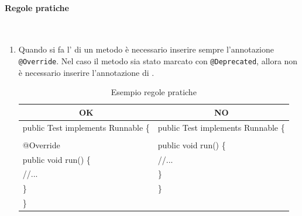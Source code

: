 \paragraph{Regole pratiche}\mbox{}\\[0.4cm]
\begin{enumerate}
	\item Quando si fa l’ di un metodo è necessario inserire sempre l’annotazione \texttt{@Override}. Nel caso il metodo sia stato marcato con \texttt{@Deprecated}, allora non è necessario inserire l’annotazione di .
	\begin{table} [H]
		\begin{center}
			\begin{tabular}{ | l | l |}
				\multicolumn{1}{c}{\textbf{OK}}&\multicolumn{1}{c}{\textbf{NO}}\\ 
				\hline
				public Test implements Runnable \{& public Test implements Runnable \{\\
				&\\
				\hspace{0.5cm}@Override & \hspace{0.5cm}public void run() \{ \\
				\hspace{0.5cm}public void run() \{& \hspace{1cm}//...\\
				\hspace{1cm}//... & \hspace{0.5cm}\} \\
				\hspace{0.5cm}\}&\}\\
				\}&\\
				\hline
			\end{tabular}
		\end{center}
		\caption{Esempio regole pratiche}
	\end{table}
		

\end{enumerate}
